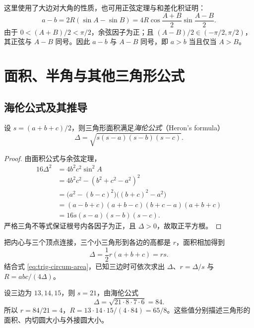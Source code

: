 \documentclass[UTF8,12pt,a4paper,fontset=fandol]{ctexart}
\begin{document}
这里使用了大边对大角的性质，也可用正弦定理与和差化积证明：
\[
  a-b=2R(\sin A-\sin B)
  =4R\cos\frac{A+B}{2}\sin\frac{A-B}{2}.
\]
由于 $0<(A+B)/2<\pi/2$，余弦因子为正；且 $(A-B)/2\in(-\pi/2,\pi/2)$，其正弦与 $A-B$ 同号。因此 $a-b$ 与 $A-B$ 同号，即 $a>b$ 当且仅当 $A>B$。

\section{面积、半角与其他三角形公式}
\label{sec:trig-triangle-more}

\subsection{海伦公式及其推导}

\begin{theorem}[海伦公式]
设 $s=(a+b+c)/2$，则三角形面积满足\emph{海伦公式}（Heron's formula）
\begin{equation}\label{eq:trig-heron}
  \boxed{\Delta=\sqrt{s(s-a)(s-b)(s-c)}}.
\end{equation}
\end{theorem}

\begin{proof}
由面积公式与余弦定理，
\begin{align*}
  16\Delta^2
  &=4b^2c^2\sin^2 A\\
  &=4b^2c^2-(b^2+c^2-a^2)^2\\
  &=\bigl(a^2-(b-c)^2\bigr)\bigl((b+c)^2-a^2\bigr)\\
  &=(a-b+c)(a+b-c)(b+c-a)(a+b+c)\\
  &=16s(s-a)(s-b)(s-c).
\end{align*}
严格三角不等式保证根号内各因子为正，且 $\Delta>0$，故取正平方根。
\end{proof}

把内心与三个顶点连接，三个小三角形到各边的高都是 $r$，面积相加得到
\begin{equation}\label{eq:trig-inradius}
  \Delta=\frac12r(a+b+c)=rs.
\end{equation}
结合式 \eqref{eq:trig-circum-area}，已知三边时可依次求出 $\Delta$、$r=\Delta/s$ 与 $R=abc/(4\Delta)$。

\begin{example}[由三边求面积与两种半径]
设三边为 $13,14,15$，则 $s=21$，由海伦公式
\[
  \Delta=\sqrt{21\cdot8\cdot7\cdot6}=84.
\]
所以 $r=84/21=4$，$R=13\cdot14\cdot15/(4\cdot84)=65/8$。这些值分别描述三角形的面积、内切圆大小与外接圆大小。
\end{example}
\end{document}
